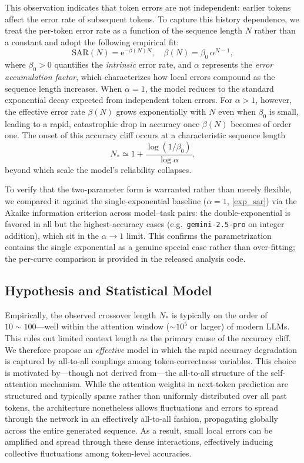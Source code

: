 \documentclass{article}
\theoremstyle{plain}
\begin{document}
This observation indicates that token errors are not independent: earlier tokens affect the error rate of subsequent tokens. To capture this history dependence, we treat the per-token error rate as a function of the sequence length $N$ rather than a constant and adopt the following empirical fit:
\begin{equation}\label{emp_sar}
    \text{SAR}(N) = \mathrm{e}^{-\beta(N)N},
    \quad \beta(N) = \beta_0\, \alpha^{N-1},
\end{equation}
where $\beta_0>0$ quantifies the \emph{intrinsic} error rate,
and $\alpha$ represents the \emph{error accumulation factor},
which characterizes how local errors compound as the sequence length increases.
When $\alpha = 1$, the model reduces to the standard exponential decay expected from independent token errors. For $\alpha > 1$, however, the effective error rate $\beta(N)$ grows exponentially with $N$ even when $\beta_0$ is small, leading to a rapid, catastrophic drop in accuracy once $\beta(N)$ becomes of order one. The onset of this accuracy cliff occurs at a characteristic sequence length
\begin{equation}\label{eq:Nc}
    N_*\simeq 1+\frac{\log(1/\beta_0)}{\log\alpha},
\end{equation}
beyond which scale the model's reliability collapses.

To verify that the two-parameter form is warranted rather than merely flexible, we compared it against the single-exponential baseline ($\alpha=1$, \cref{exp_sar}) via the Akaike information criterion across model--task pairs: the double-exponential is favored in all but the highest-accuracy cases (e.g.\ \texttt{gemini-2.5-pro} on integer addition), which sit in the $\alpha\to1$ limit. This confirms the parametrization contains the single exponential as a genuine special case rather than over-fitting; the per-curve comparison is provided in the released analysis code.

\subsection{Hypothesis and Statistical Model}

Empirically, the observed crossover length $N_*$ is typically on the order of $10\sim 100$---well within the attention window ($\sim 10^5$ or larger) of modern LLMs. This rules out limited context length as the primary cause of the accuracy cliff. We therefore propose an \emph{effective} model in which the rapid accuracy degradation is captured by all-to-all couplings among token-correctness variables. This choice is motivated by---though not derived from---the all-to-all structure of the self-attention mechanism. While the attention weights in next-token prediction are structured and typically sparse rather than uniformly distributed over all past tokens, the architecture nonetheless allows fluctuations and errors to spread through the network in an effectively all-to-all fashion, propagating globally across the entire generated sequence. As a result, small local errors can be amplified and spread through these dense interactions, effectively inducing collective fluctuations among token-level accuracies.
\end{document}
